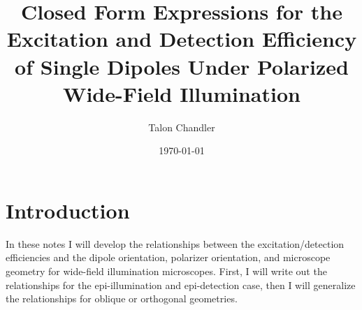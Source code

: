 \documentclass[11pt]{article}
\begin{document}
\title{\vspace{-2.5em} Closed Form Expressions for the Excitation and Detection Efficiency of Single Dipoles Under Polarized Wide-Field Illumination \vspace{-1em}}
\author{Talon Chandler}%
\date{\vspace{-1em}\today\vspace{-1em}}
\maketitle
\section{Introduction}
In these notes I will develop the relationships between the excitation/detection
efficiencies and the dipole orientation, polarizer orientation, and microscope
geometry for wide-field illumination microscopes. First, I will write out the
relationships for the epi-illumination and epi-detection case, then I will
generalize the relationships for oblique or orthogonal geometries. 
\end{document}
